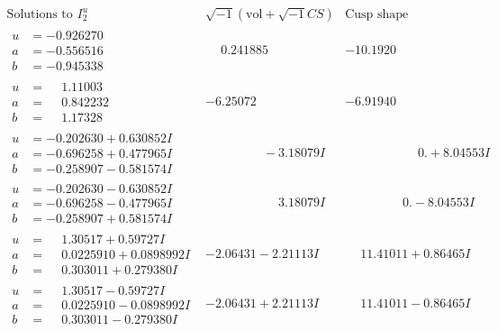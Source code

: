 \documentclass[1p]{elsarticle_modified}
\theoremstyle{definition}
\newcommand{\I}{\sqrt{-1}}
\begin{document}
$$\begin{array}{c|c|c}  
\text{Solutions to }I^u_{2}& \I (\text{vol} + \sqrt{-1}CS) & \text{Cusp shape}\\
 \hline 
\begin{aligned}
u &= -0.926270\phantom{ +0.000000I} \\
a &= -0.556516\phantom{ +0.000000I} \\
b &= -0.945338\phantom{ +0.000000I}\end{aligned}
 & \phantom{-}0.241885\phantom{ +0.000000I} & -10.1920\phantom{ +0.000000I} \\ \hline\begin{aligned}
u &= \phantom{-}1.11003\phantom{ +0.000000I} \\
a &= \phantom{-}0.842232\phantom{ +0.000000I} \\
b &= \phantom{-}1.17328\phantom{ +0.000000I}\end{aligned}
 & -6.25072\phantom{ +0.000000I} & -6.91940\phantom{ +0.000000I} \\ \hline\begin{aligned}
u &= -0.202630 + 0.630852 I \\
a &= -0.696258 + 0.477965 I \\
b &= -0.258907 - 0.581574 I\end{aligned}
 & \phantom{-0.000000 } -3.18079 I & \phantom{-0.000000 -}0. + 8.04553 I \\ \hline\begin{aligned}
u &= -0.202630 - 0.630852 I \\
a &= -0.696258 - 0.477965 I \\
b &= -0.258907 + 0.581574 I\end{aligned}
 & \phantom{-0.000000 -}3.18079 I & \phantom{-0.000000 } 0. - 8.04553 I \\ \hline\begin{aligned}
u &= \phantom{-}1.30517 + 0.59727 I \\
a &= \phantom{-}0.0225910 + 0.0898992 I \\
b &= \phantom{-}0.303011 + 0.279380 I\end{aligned}
 & -2.06431 - 2.21113 I & \phantom{-}11.41011 + 0.86465 I \\ \hline\begin{aligned}
u &= \phantom{-}1.30517 - 0.59727 I \\
a &= \phantom{-}0.0225910 - 0.0898992 I \\
b &= \phantom{-}0.303011 - 0.279380 I\end{aligned}
 & -2.06431 + 2.21113 I & \phantom{-}11.41011 - 0.86465 I \\ \hline\begin{aligned}

\end{aligned}
\end{array}$$
\end{document}
